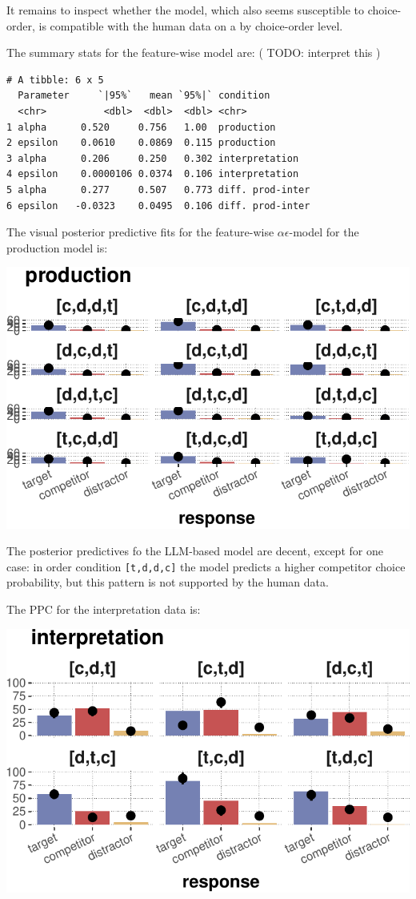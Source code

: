 \documentclass{article}
\begin{document}
It remains to inspect whether the model, which also seems susceptible to
choice-order, is compatible with the human data on a by choice-order
level.

The summary stats for the feature-wise model are: ( { TODO: interpret
this })

\begin{verbatim}
# A tibble: 6 x 5
  Parameter     `|95%`   mean `95%|` condition
  <chr>          <dbl>  <dbl>  <dbl> <chr>
1 alpha      0.520     0.756   1.00  production
2 epsilon    0.0610    0.0869  0.115 production
3 alpha      0.206     0.250   0.302 interpretation
4 epsilon    0.0000106 0.0374  0.106 interpretation
5 alpha      0.277     0.507   0.773 diff. prod-inter
6 epsilon   -0.0323    0.0495  0.106 diff. prod-inter
\end{verbatim}

The visual posterior predictive fits for the feature-wise
\(\alpha\epsilon\)-model for the production model is:

\includegraphics{00-pics/PPC-choice-1.pdf}

The posterior predictives fo the LLM-based model are decent, except for
one case: in order condition \texttt{{[}t,d,d,c{]}} the model predicts a
higher competitor choice probability, but this pattern is not supported
by the human data.

The PPC for the interpretation data is:

\includegraphics{00-pics/PPC-choice-interpretation-1.pdf}
\end{document}

